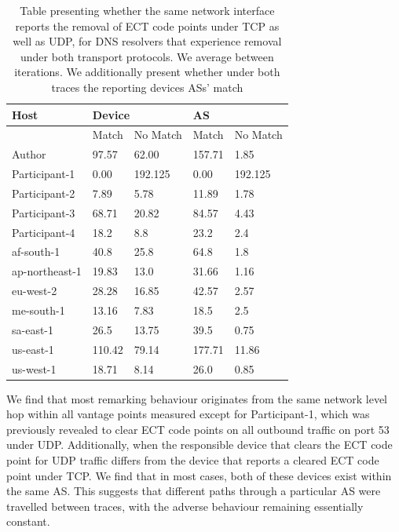 \documentclass{l4proj}
\begin{document}
\begin{table}[H]
\centering
\begin{tabular}{|l|l|p{1cm}|l|p{1cm}|}
\hline
Host          & \multicolumn{2}{l|}{Device} & \multicolumn{2}{l|}{AS} \\ \hline
              & Match    & No \newline Match    & Match  & No \newline Match  \\ \hline
Author        & 97.57     & 62.00            & 157.71      & 1.85        \\ \hline
Participant-1 & 0.00     & 192.125            & 0.00      & 192.125        \\ \hline
Participant-2 & 7.89      & 5.78            & 11.89      & 1.78         \\ \hline
Participant-3 & 68.71     & 20.82            & 84.57      & 4.43        \\ \hline
Participant-4 & 18.2      & 8.8            & 23.2      & 2.4         \\ \hline
af-south-1        & 40.8     & 25.8            & 64.8      & 1.8        \\ \hline
ap-northeast-1 & 19.83     & 13.0            & 31.66      & 1.16        \\ \hline
eu-west-2 & 28.28      & 16.85            & 42.57      & 2.57         \\ \hline
me-south-1 & 13.16     & 7.83            & 18.5      & 2.5        \\ \hline
sa-east-1 & 26.5      & 13.75            & 39.5      & 0.75         \\ \hline
us-east-1 & 110.42      &  79.14  & 177.71      & 11.86         \\ \hline
us-west-1 & 18.71      & 8.14         & 26.0      & 0.85         \\ \hline
\end{tabular}

\caption{Table presenting whether the same network interface reports the removal of ECT code points under TCP as well as UDP, for DNS resolvers that experience removal under both transport protocols. We average between iterations. We additionally present whether under both traces the reporting devices ASs' match}
\label{tab:udptcp}

\end{table}


We find that most remarking behaviour originates from the same network level hop within all vantage points measured except for Participant-1, which was previously revealed to clear ECT code points on all outbound traffic on port 53 under UDP. Additionally, when the responsible device that clears the ECT code point for UDP traffic differs from the device that reports a cleared ECT code point under TCP. We find that in most cases, both of these devices exist within the same AS. This suggests that different paths through a particular AS were travelled between traces, with the adverse behaviour remaining essentially constant.
\end{document}
